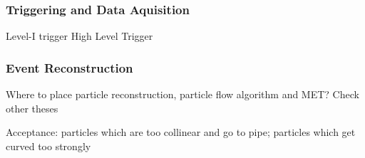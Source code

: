 \subsubsection{Triggering and Data Aquisition}
Level-I trigger
High Level Trigger

\subsubsection{Event Reconstruction}
Where to place particle reconstruction, particle flow algorithm and MET? Check other theses

Acceptance: particles which are too collinear and go to pipe; particles which get curved too strongly
